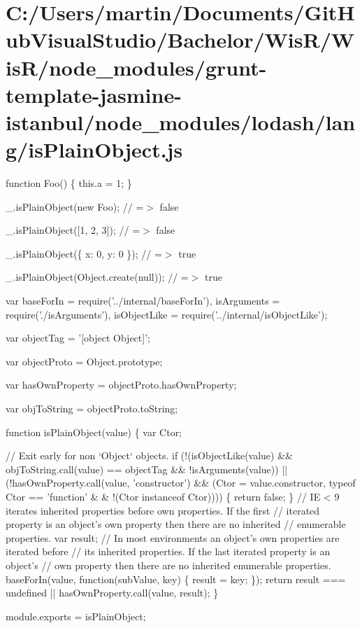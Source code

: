 \hypertarget{_c_1_2_users_2martin_2_documents_2_git_hub_visual_studio_2_bachelor_2_wis_r_2_wis_r_2node_module9fb4adda9ff854a6c3a4cd036c7c3911}{}\section{C\+:/\+Users/martin/\+Documents/\+Git\+Hub\+Visual\+Studio/\+Bachelor/\+Wis\+R/\+Wis\+R/node\+\_\+modules/grunt-\/template-\/jasmine-\/istanbul/node\+\_\+modules/lodash/lang/is\+Plain\+Object.\+js}
function Foo() \{ this.\+a = 1; \}

\+\_\+.\+is\+Plain\+Object(new Foo); // =$>$ false

\+\_\+.\+is\+Plain\+Object(\mbox{[}1, 2, 3\mbox{]}); // =$>$ false

\+\_\+.\+is\+Plain\+Object(\{ \textquotesingle{}x\textquotesingle{}\+: 0, \textquotesingle{}y\textquotesingle{}\+: 0 \}); // =$>$ true

\+\_\+.\+is\+Plain\+Object(Object.\+create(null)); // =$>$ true


\begin{DoxyCodeInclude}
var baseForIn = require(\textcolor{stringliteral}{'../internal/baseForIn'}),
    isArguments = require(\textcolor{stringliteral}{'./isArguments'}),
    isObjectLike = require(\textcolor{stringliteral}{'../internal/isObjectLike'});

var objectTag = \textcolor{stringliteral}{'[object Object]'};

var objectProto = Object.prototype;

var hasOwnProperty = objectProto.hasOwnProperty;

var objToString = objectProto.toString;

\textcolor{keyword}{function} isPlainObject(value) \{
  var Ctor;

  \textcolor{comment}{// Exit early for non `Object` objects.}
  \textcolor{keywordflow}{if} (!(isObjectLike(value) && objToString.call(value) == objectTag && !isArguments(value)) ||
      (!hasOwnProperty.call(value, \textcolor{stringliteral}{'constructor'}) && (Ctor = value.constructor, typeof Ctor == \textcolor{stringliteral}{'function'} &
      & !(Ctor instanceof Ctor)))) \{
    \textcolor{keywordflow}{return} \textcolor{keyword}{false};
  \}
  \textcolor{comment}{// IE < 9 iterates inherited properties before own properties. If the first}
  \textcolor{comment}{// iterated property is an object's own property then there are no inherited}
  \textcolor{comment}{// enumerable properties.}
  var result;
  \textcolor{comment}{// In most environments an object's own properties are iterated before}
  \textcolor{comment}{// its inherited properties. If the last iterated property is an object's}
  \textcolor{comment}{// own property then there are no inherited enumerable properties.}
  baseForIn(value, \textcolor{keyword}{function}(subValue, key) \{
    result = key;
  \});
  \textcolor{keywordflow}{return} result === undefined || hasOwnProperty.call(value, result);
\}

module.exports = isPlainObject;
\end{DoxyCodeInclude}
 